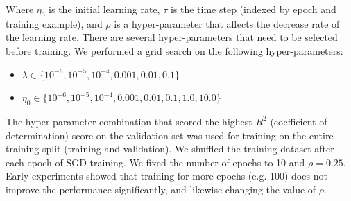 \documentclass[letterpaper]{article}
\begin{document}
Where $\eta_0$ is the initial learning rate, $\tau$ is the time step (indexed by epoch and training example), and $\rho$ is a hyper-parameter that affects the decrease rate of the learning rate. There are several hyper-parameters that need to be selected before training. We performed a grid search on the following hyper-parameters:
\begin{itemize}
\item $\lambda \in \{10^{-6}, 10^{-5}, 10^{-4},0.001,0.01, 0.1\}$
\item $\eta_0 \in \{10^{-6}, 10^{-5}, 10^{-4},0.001,0.01, 0.1,1.0,10.0\}$
\end{itemize}

The hyper-parameter combination that scored the highest $R^2$ (coefficient of determination) score on the validation set was used for training on the entire training split (training and validation). We shuffled the training dataset after each epoch of SGD training. We fixed the number of epochs to 10 and $\rho=0.25$. Early experiments showed that training for more epochs (e.g. 100) does not improve the performance significantly, and likewise changing the value of $\rho$.
\end{document}
